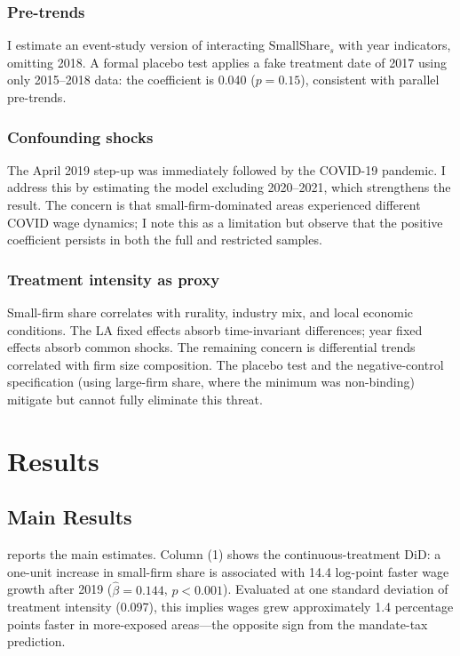 \documentclass[12pt]{article}
\begin{document}
\subsubsection*{Pre-trends} I estimate an event-study version of  interacting $\text{SmallShare}_s$ with year indicators, omitting 2018. A formal placebo test applies a fake treatment date of 2017 using only 2015--2018 data: the coefficient is 0.040 ($p = 0.15$), consistent with parallel pre-trends.

\subsubsection*{Confounding shocks} The April 2019 step-up was immediately followed by the COVID-19 pandemic. I address this by estimating the model excluding 2020--2021, which strengthens the result. The concern is that small-firm-dominated areas experienced different COVID wage dynamics; I note this as a limitation but observe that the positive coefficient persists in both the full and restricted samples.

\subsubsection*{Treatment intensity as proxy} Small-firm share correlates with rurality, industry mix, and local economic conditions. The LA fixed effects absorb time-invariant differences; year fixed effects absorb common shocks. The remaining concern is differential trends correlated with firm size composition. The placebo test and the negative-control specification (using large-firm share, where the minimum was non-binding) mitigate but cannot fully eliminate this threat.


\section{Results}
\label{sec:results}

\subsection{Main Results}

 reports the main estimates. Column (1) shows the continuous-treatment DiD: a one-unit increase in small-firm share is associated with 14.4 log-point faster wage growth after 2019 ($\hat{\beta} = 0.144$, $p < 0.001$). Evaluated at one standard deviation of treatment intensity (0.097), this implies wages grew approximately 1.4 percentage points faster in more-exposed areas---the opposite sign from the mandate-tax prediction.
\end{document}
